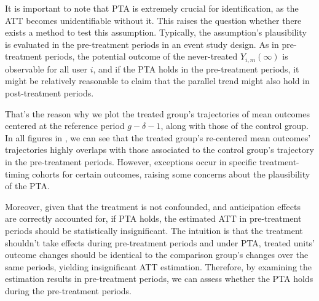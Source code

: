 
It is important to note that PTA is extremely crucial for identification, as the ATT becomes unidentifiable without it. This raises the question whether there exists a method to test this assumption.
Typically, the assumption's plausibility is evaluated in the pre-treatment periods in an event study design.
As in pre-treatment periods, the potential outcome of the never-treated $Y_{i, m}(\infty)$ is observable for all user $i$, and if the PTA holds in the pre-treatment periods, it might be relatively reasonable to claim that the parallel trend might also hold in post-treatment periods.

That's the reason why we plot the treated group's trajectories of mean outcomes centered at the reference period $g-\delta-1$, along with those of the control group.
In all figures in , we can see that the treated group's re-centered mean outcomes' trajectories highly overlaps with those associated to the control group's trajectory in the pre-treatment periods.
However, exceptions occur in specific treatment-timing cohorts for certain outcomes, raising some concerns about the plausibility of the PTA.

Moreover, given that the treatment is not confounded, and anticipation effects are correctly accounted for, if PTA holds, the estimated ATT in pre-treatment periods should be statistically insignificant.
The intuition is that the treatment shouldn't take effects during pre-treatment periods and under PTA, treated units' outcome changes should be identical to the comparison group's changes over the same periods, yielding insignificant ATT estimation.
Therefore, by examining the estimation results in pre-treatment periods, we can assess whether the PTA holds during the pre-treatment periods.


